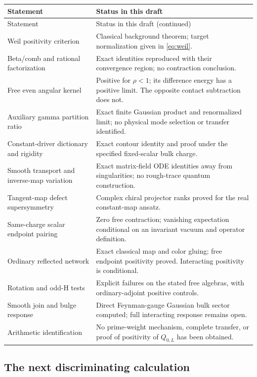 \renewcommand{\arraystretch}{1.15}
\begin{longtable}{@{}p{}p{}@{}}
\toprule
Statement & Status in this draft\\
\midrule
\endfirsthead
\toprule
Statement & Status in this draft (continued)\\
\midrule
\endhead
\bottomrule
\endfoot
Weil positivity criterion & Classical background theorem; target
normalization given in \eqref{eq:weil}.\\
Beta/comb and rational factorization & Exact identities reproduced
with their convergence region; no contraction conclusion.\\
Free even angular kernel & Positive for $\rho<1$; its difference
energy has a positive limit. The opposite contact subtraction does not.\\
Auxiliary gamma partition ratio & Exact finite Gaussian product and
renormalized limit; no physical mode selection or transfer identified.\\
Constant-driver dictionary and rigidity & Exact contour identity and
proof under the specified fixed-scalar bulk charge.\\
Smooth transport and inverse-map variation & Exact matrix-field ODE
identities away from singularities; no rough-trace quantum construction.\\
Tangent-map defect supersymmetry & Complex chiral projector ranks proved
for the real constant-map ansatz.\\
Same-charge scalar endpoint pairing & Zero free contraction; vanishing
expectation conditional on an invariant vacuum and operator definition.\\
Ordinary reflected network & Exact classical map and color gluing;
free endpoint positivity proved. Interacting positivity is conditional.\\
Rotation and odd-H tests & Explicit failures on the stated free
algebras, with ordinary-adjoint positive controls.\\
Smooth join and bulge response & Direct Feynman-gauge Gaussian bulk
sector computed; full interacting response remains open.\\
Arithmetic identification & No prime-weight mechanism, complete
transfer, or proof of positivity of $Q_{0,L}$ has been obtained.\\
\end{longtable}
\renewcommand{\arraystretch}{1}

\subsection{The next discriminating calculation}


